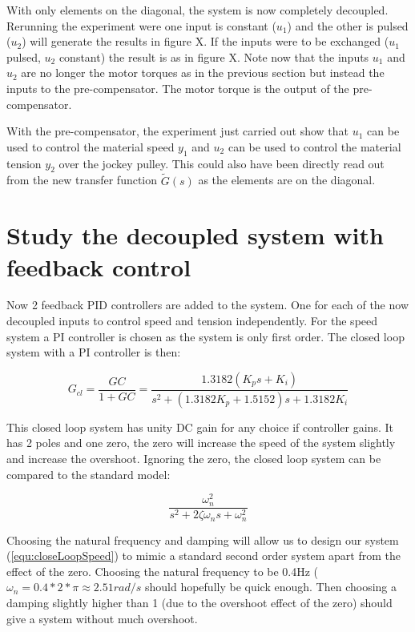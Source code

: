 \documentclass[a4paper, titlepage]{article}
\begin{document}
With only elements on the diagonal, the system is now completely decoupled.
Rerunning the experiment were one input is constant ($u_1$) and the other is pulsed ($u_2$) will generate the results in figure X.
If the inputs were to be exchanged ($u_1$ pulsed, $u_2$ constant) the result is as in figure X.
Note now that the inputs $u_1$ and $u_2$ are no longer the motor torques as in the previous section but instead the inputs to the pre-compensator.
The motor torque is the output of the pre-compensator.

With the pre-compensator, the experiment just carried out show that $u_1$ can be used to control the material speed $y_1$ and $u_2$ can be used to control the material tension $y_2$ over the jockey pulley.
This could also have been directly read out from the new transfer function $\tilde{G}(s)$ as the elements are on the diagonal.

\section{Study the decoupled system with feedback control}
Now 2 feedback PID controllers are added to the system.
One for each of the now decoupled inputs to control speed and tension independently.
For the speed system a PI controller is chosen as the system is only first order.
The closed loop system with a PI controller is then:

\begin{equation}
G_{cl} = \frac{GC}{1 + GC} = \frac{1.3182(K_ps+K_i)}{s^2 + (1.3182K_p+1.5152)s + 1.3182K_i}
\label{equ:closeLoopSpeed}
\end{equation}

This closed loop system has unity DC gain for any choice if controller gains.
It has 2 poles and one zero, the zero will increase the speed of the system slightly and increase the overshoot.
Ignoring the zero, the closed loop system can be compared to the standard model:

\begin{equation}
\frac{\omega_n^2}{s^2 + 2\zeta\omega_ns + \omega_n^2}
\end{equation}

Choosing the natural frequency and damping will allow us to design our system (\ref{equ:closeLoopSpeed}) to mimic a standard second order system apart from the effect of the zero.
Choosing the natural frequency to be 0.4Hz ($\omega_n = 0.4*2*\pi \approx 2.51rad/s$ should hopefully be quick enough.
Then choosing a damping slightly higher than 1 (due to the overshoot effect of the zero) should give a system without much overshoot.
\end{document}
